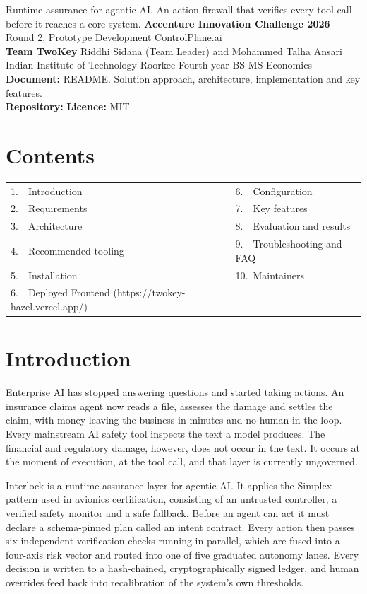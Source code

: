 \documentclass[10pt]{article}
\begin{document}
{Runtime assurance for agentic AI. An action firewall that verifies every tool call before it reaches a core system.}
{\textbf{Accenture Innovation Challenge 2026} \quad Round 2, Prototype Development \quad ControlPlane.ai\\[3pt]
\textbf{Team TwoKey} \quad Riddhi Sidana (Team Leader) and Mohammed Talha Ansari\\[3pt]
Indian Institute of Technology Roorkee \quad Fourth year BS-MS Economics}
{\textbf{Document:} README. Solution approach, architecture, implementation and key features.\\[3pt]
\textbf{Repository:}  \quad \textbf{Licence:} MIT}

\section*{Contents}
\vspace{-4pt}
{\small
\begin{xltabular}{\textwidth}{@{}L{0.47\textwidth}L{0.47\textwidth}@{}}
1.\ \ Introduction & 6.\ \ Configuration \\
2.\ \ Requirements & 7.\ \ Key features \\
3.\ \ Architecture & 8.\ \ Evaluation and results \\
4.\ \ Recommended tooling & 9.\ \ Troubleshooting and FAQ \\
5.\ \ Installation & 10.\ Maintainers \\
6.\ \ Deployed Frontend (https://twokey-hazel.vercel.app/) & \\
\end{xltabular}}

\section{Introduction}

Enterprise AI has stopped answering questions and started taking actions. An insurance
claims agent now reads a file, assesses the damage and settles the claim, with money
leaving the business in minutes and no human in the loop. Every mainstream AI safety
tool inspects the text a model produces. The financial and regulatory damage, however,
does not occur in the text. It occurs at the moment of execution, at the tool call, and
that layer is currently ungoverned.

Interlock is a runtime assurance layer for agentic AI. It applies the Simplex pattern
used in avionics certification, consisting of an untrusted controller, a verified safety
monitor and a safe fallback. Before an agent can act it must declare a schema-pinned plan
called an intent contract. Every action then passes six independent verification checks
running in parallel, which are fused into a four-axis risk vector and routed into one of
five graduated autonomy lanes. Every decision is written to a hash-chained,
cryptographically signed ledger, and human overrides feed back into recalibration of the
system's own thresholds.
\end{document}
